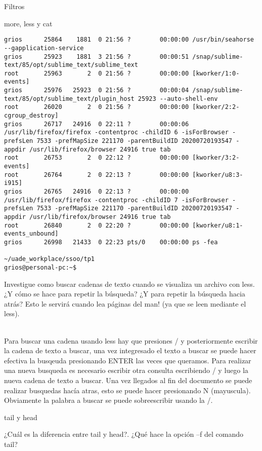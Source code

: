 \begin{section}{Filtros}
\begin{subsection}{more, less y cat}
\begin{lstlisting}[style=Ubuntu]
grios      25864    1881  0 21:56 ?        00:00:00 /usr/bin/seahorse --gapplication-service
grios      25923    1881  3 21:56 ?        00:00:51 /snap/sublime-text/85/opt/sublime_text/sublime_text
root       25963       2  0 21:56 ?        00:00:00 [kworker/1:0-events]
grios      25976   25923  0 21:56 ?        00:00:04 /snap/sublime-text/85/opt/sublime_text/plugin_host 25923 --auto-shell-env
root       26020       2  0 21:56 ?        00:00:00 [kworker/2:2-cgroup_destroy]
grios      26717   24916  0 22:11 ?        00:00:06 /usr/lib/firefox/firefox -contentproc -childID 6 -isForBrowser -prefsLen 7533 -prefMapSize 221170 -parentBuildID 20200720193547 -appdir /usr/lib/firefox/browser 24916 true tab
root       26753       2  0 22:12 ?        00:00:00 [kworker/3:2-events]
root       26764       2  0 22:13 ?        00:00:00 [kworker/u8:3-i915]
grios      26765   24916  0 22:13 ?        00:00:00 /usr/lib/firefox/firefox -contentproc -childID 7 -isForBrowser -prefsLen 7533 -prefMapSize 221170 -parentBuildID 20200720193547 -appdir /usr/lib/firefox/browser 24916 true tab
root       26840       2  0 22:20 ?        00:00:00 [kworker/u8:1-events_unbound]
grios      26998   21433  0 22:23 pts/0    00:00:00 ps -fea

~/uade_workplace/ssoo/tp1
grios@personal-pc:~$ 
\end{lstlisting}

\begin{quoting}
Investigue como buscar cadenas de texto cuando se visualiza un archivo con less. ¿Y cómo se hace
para repetir la búsqueda? ¿Y para repetir la búsqueda hacia atrás? Esto le servirá cuando lea páginas del
man! (ya que se leen mediante el less).
\end{quoting}\\
Para buscar una cadena usando less hay que presiones / y posteriormente escribir la cadena de texto a buscar, una vez integresado el texto a buscar se puede hacer efectiva la busqeuda presionando ENTER las veces que queramos. 
Para realizar una nueva busqueda es necesario escribir otra consulta escribiendo / y luego la nueva cadena de texto a buscar.
Una vez llegados al fin del documento se puede realizar busquedas hacía atras, esto se puede hacer presionando N (mayuscula). Obviamente la palabra a buscar se puede sobreescribir usando la /.
\end{subsection}

\begin{subsection}{tail y head}
\begin{quoting}
¿Cuál es la diferencia entre tail y head?. ¿Qué hace la opción –f del comando tail?
\end{quoting}\\


\end{subsection}
\end{section}
